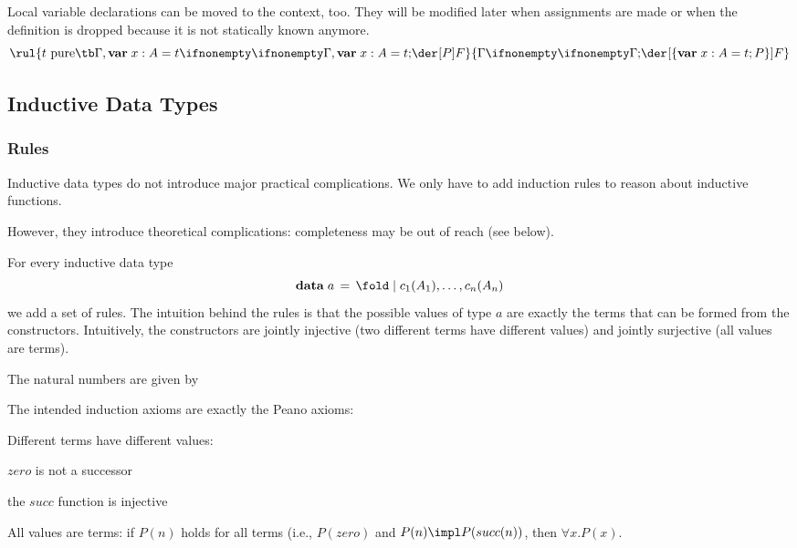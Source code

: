 Local variable declarations can be moved to the context, too. They will be modified later when assignments are made or when the definition is dropped because it is not statically known anymore.
\[\rul{t\text{ pure}\tb\iscons{}{\Gamma,\amval{x}{A}{t}}{}{\abox{P}{F}}}
      {\iscons{}{\Gamma}{}{\abox{\{\amval{x}{A}{t}; P\}}{F}}}
\]


\subsection{Inductive Data Types}

\subsubsection{Rules}

Inductive data types do not introduce major practical complications.
We only have to add induction rules to reason about inductive functions.

However, they introduce theoretical complications: completeness may be out of reach (see below).

For every inductive data type
\[\adata{a}{c_1(A_1),\ldots,c_n(A_n)}\]
we add a set of rules.
The intuition behind the rules is that the possible values of type $a$ are exactly the terms that can be formed from the constructors.
Intuitively, the constructors are jointly injective (two different terms have different values) and jointly surjective (all values are terms).

\begin{example}\label{ex:typetheory:nat2}
The natural numbers are given by
\begin{acode}
\end{acode}

The intended induction axioms are exactly the Peano axioms:
\begin{compactitem}
 \item Different terms have different values:
   \begin{compactitem}
    \item $zero$ is not a successor
    \item the $succ$ function is injective
   \end{compactitem}
 \item All values are terms: if $P(n)$ holds for all terms (i.e., $P(zero)$ and $P(n)\impl P(succ(n))$, then $\forall x.P(x)$.
\end{compactitem}
\end{example}

